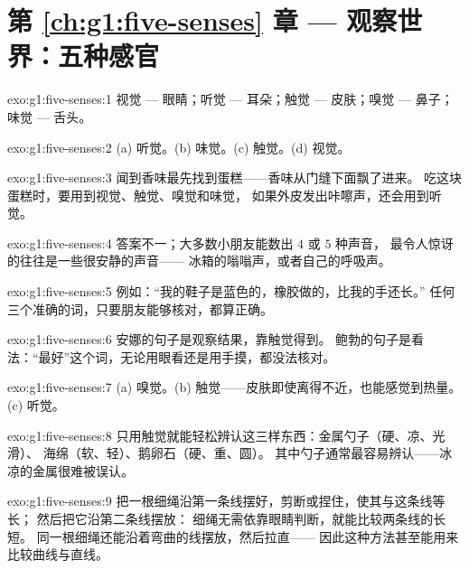 \section*{第 \ref{ch:g1:five-senses} 章 --- 观察世界：五种感官}

\begin{solution}{exo:g1:five-senses:1}
视觉 --- 眼睛；听觉 --- 耳朵；触觉 --- 皮肤；嗅觉 --- 鼻子；
味觉 --- 舌头。
\end{solution}

\begin{solution}{exo:g1:five-senses:2}
(a) 听觉。(b) 味觉。(c) 触觉。(d) 视觉。
\end{solution}

\begin{solution}{exo:g1:five-senses:3}
闻到香味最先找到蛋糕——香味从门缝下面飘了进来。
吃这块蛋糕时，要用到视觉、触觉、嗅觉和味觉，
如果外皮发出咔嚓声，还会用到听觉。
\end{solution}

\begin{solution}{exo:g1:five-senses:4}
答案不一；大多数小朋友能数出 $4$ 或 $5$ 种声音，
最令人惊讶的往往是一些很安静的声音——
冰箱的嗡嗡声，或者自己的呼吸声。
\end{solution}

\begin{solution}{exo:g1:five-senses:5}
例如：“我的鞋子是蓝色的，橡胶做的，比我的手还长。”
任何三个准确的词，只要朋友能够核对，都算正确。
\end{solution}

\begin{solution}{exo:g1:five-senses:6}
安娜的句子是观察结果，靠触觉得到。
鲍勃的句子是看法：“最好”这个词，无论用眼看还是用手摸，都没法核对。
\end{solution}

\begin{solution}{exo:g1:five-senses:7}
(a) 嗅觉。(b) 触觉——皮肤即使离得不近，也能感觉到热量。
(c) 听觉。
\end{solution}

\begin{solution}{exo:g1:five-senses:8}
只用触觉就能轻松辨认这三样东西：金属勺子（硬、凉、光滑）、
海绵（软、轻）、鹅卵石（硬、重、圆）。
其中勺子通常最容易辨认——冰凉的金属很难被误认。
\end{solution}

\begin{solution}{exo:g1:five-senses:9}
把一根细绳沿第一条线摆好，剪断或捏住，使其与这条线等长；
然后把它沿第二条线摆放：
细绳无需依靠眼睛判断，就能比较两条线的长短。
同一根细绳还能沿着弯曲的线摆放，然后拉直——
因此这种方法甚至能用来比较曲线与直线。
\end{solution}
